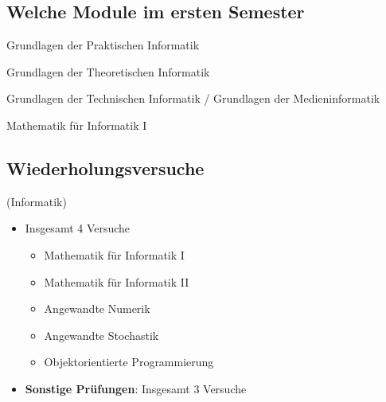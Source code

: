 \documentclass[
	aspectratio=169, 
	10pt 
]{beamer}
\begin{document}
\subsection{Welche Module im ersten Semester}

\begin{frame}{\insertsubsection}
    \begin{fancycolumns}
        \begin{gdpi}{} Grundlagen der Praktischen Informatik\newline\end{gdpi}
        \begin{gdti}{} Grundlagen der Theoretischen Informatik\newline\end{gdti}

        \nextcolumn
        \begin{gdtech}{} Grundlagen der Technischen Informatik / \newline Grundlagen der Medieninformatik\end{gdtech}
        \begin{mathb}{} Mathematik für Informatik I\newline\end{mathb}
    \end{fancycolumns}
\end{frame}

\subsection{Wiederholungsversuche}
\begin{frame}{\insertsubsection \space (Informatik)}
    \begin{itemize}
        \item Insgesamt 4 Versuche \footnotemark[1] \begin{itemize} 
            \item Mathematik für Informatik I
            \item Mathematik für Informatik II
            \item Angewandte Numerik
            \item Angewandte Stochastik
            \item Objektorientierte Programmierung \end{itemize}
        \item \textbf{Sonstige Prüfungen}: Insgesamt 3 Versuche
    \end{itemize}

\end{frame}
\end{document}
